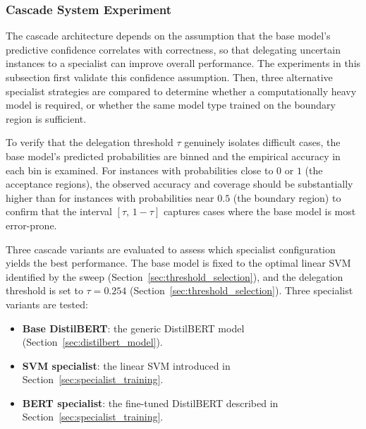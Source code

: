\documentclass[a4paper,fleqn]{cas-dc}
\newcommand{\thresh}{\tau}
\begin{document}
\subsubsection{Cascade System Experiment} \label{sec:CascadeSysExp}

The cascade architecture depends on the assumption that the base model's predictive confidence correlates with correctness, so that delegating uncertain instances to a specialist can improve overall performance. The experiments in this subsection first validate this confidence assumption. Then, three alternative specialist strategies are compared to determine whether a computationally heavy model is required, or whether the same model type trained on the boundary region is sufficient.


To verify that the delegation threshold $\thresh$ genuinely isolates difficult cases, the base model's predicted probabilities are binned and the empirical accuracy in each bin is examined. For instances with probabilities close to $0$ or $1$ (the acceptance regions), the observed accuracy and coverage should be substantially higher than for instances with probabilities near $0.5$ (the boundary region) to confirm that the interval $[\thresh,\,1-\thresh]$ captures cases where the base model is most error-prone.


Three cascade variants are evaluated to assess which specialist configuration yields the best performance. The base model is fixed to the optimal linear SVM identified by the sweep (Section~\ref{sec:threshold_selection}), and the delegation threshold is set to $\thresh = 0.254$ (Section~\ref{sec:threshold_selection}). Three specialist variants are tested:

\begin{itemize}
	\item \textbf{Base DistilBERT}: the generic DistilBERT model (Section~\ref{sec:distilbert_model}).
	\item \textbf{SVM specialist}: the linear SVM introduced in Section~\ref{sec:specialist_training}.
	\item \textbf{BERT specialist}: the fine-tuned DistilBERT described in Section~\ref{sec:specialist_training}.
\end{itemize}
\end{document}
